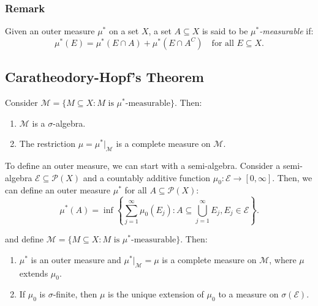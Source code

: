 \documentclass[11pt]{article}
\begin{document}
\subsubsection*{Remark}
Given an outer measure \(\mu^*\) on a set \(X\), a set \(A \subseteq X\) is said to be \textit{\(\mu^*\)-measurable} if:
\[\mu^*(E) = \mu^*(E \cap A) + \mu^*(E \cap A^C) \quad \text{for all } E \subseteq X.\]

\subsection{Caratheodory-Hopf's Theorem}
Consider \(\mathcal{M} = \{M \subseteq X : M \text{ is } \mu^*\text{-measurable}\}\). Then:
\begin{enumerate}
    \item \(\mathcal{M}\) is a \(\sigma\)-algebra.
    \item The restriction \(\mu = \mu^*|_{\mathcal{M}}\) is a complete measure on \(\mathcal{M}\).
\end{enumerate}

To define an outer measure, we can start with a semi-algebra. Consider a semi-algebra \(\mathcal{E} \subseteq \mathcal{P}(X)\) and a countably additive function \(\mu_0: \mathcal{E} \to [0, \infty]\). Then, we can define an outer measure \(\mu^*\) for all \(A \subseteq \mathcal{P}(X)\):
\[\mu^*(A) = \inf\left\{\sum_{j=1}^{\infty} \mu_0(E_j) : A \subseteq \bigcup_{j=1}^{\infty} E_j, E_j \in \mathcal{E}\right\}.\]

and define \(\mathcal{M} = \{M \subseteq X : M \text{ is } \mu^*\text{-measurable}\}\). Then:
\begin{enumerate}
    \item \(\mu^*\) is an outer measure and \(\mu^*|_{\mathcal{M}} = \mu\) is a complete measure on \(\mathcal{M}\), where \(\mu\) extends \(\mu_0\).
    \item If \(\mu_0\) is \(\sigma\)-finite, then \(\mu\) is the unique extension of \(\mu_0\) to a measure on \(\sigma(\mathcal{E})\).
\end{enumerate}
\end{document}

